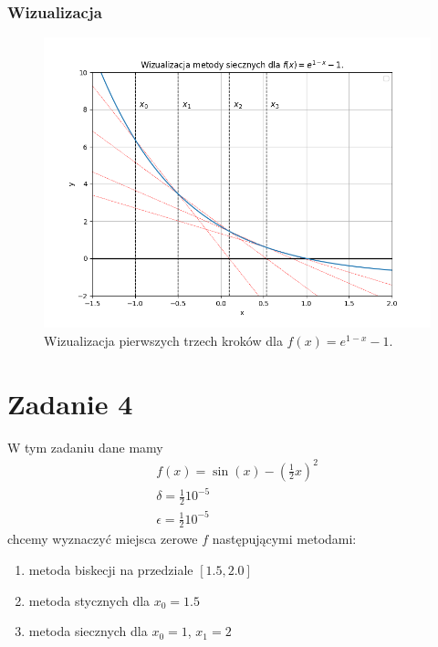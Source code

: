 \documentclass{article}
\begin{document}
\subsubsection*{Wizualizacja}
\begin{figure}[H]
  \centering
  \includegraphics[width=\textwidth]{./ex2_2.png}
  \caption{Wizualizacja pierwszych trzech kroków dla $f(x) = e^{1-x} - 1$.}
\end{figure}



\section*{Zadanie 4}
W tym zadaniu dane mamy
\begin{gather*}
f(x) = \sin(x) - {(\frac{1}{2}x)}^2\\
\delta = \frac{1}{2}10^{-5}\\
\epsilon = \frac{1}{2}10^{-5}
\end{gather*}
chcemy wyznaczyć miejsca zerowe $f$ następującymi metodami:
\begin{enumerate}
  \item metoda biskecji na przedziale $[1.5, 2.0]$
  \item metoda stycznych dla $x_0=1.5$
  \item metoda siecznych dla $x_0=1$, $x_1=2$
\end{enumerate}
\end{document}
